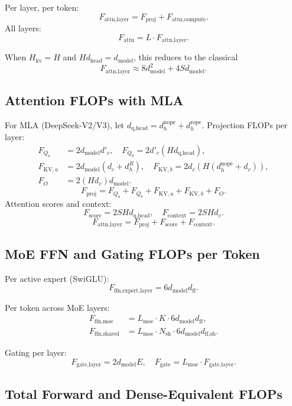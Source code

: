 \documentclass[11pt]{article}
\begin{document}
Per layer, per token:
\[
F_{\text{attn,layer}} = F_{\text{proj}} + F_{\text{attn,compute}}.
\]
All layers:
\[
F_{\text{attn}} = L \cdot F_{\text{attn,layer}}.
\]

When $H_{\text{kv}} = H$ and $H d_{\text{head}} = d_{\text{model}}$,
this reduces to the classical
\[
F_{\text{attn,layer}} \approx
8 d_{\text{model}}^2 + 4 S d_{\text{model}}.
\]

\subsection{Attention FLOPs with MLA}
For MLA (DeepSeek-V2/V3), let $d_{\text{q,head}} = d^{\text{nope}}_h + d^{\text{rope}}_h$.
Projection FLOPs per layer:
\begin{align*}
F_{Q_a} &= 2 d_{\text{model}} d'_c, \quad
F_{Q_b} = 2 d'_c (H d_{\text{q,head}}), \\
F_{\text{KV},a} &= 2 d_{\text{model}} (d_c + d^R_h), \quad
F_{\text{KV},b} = 2 d_c (H (d^{\text{nope}}_h + d_v)), \\
F_O &= 2 (H d_v) d_{\text{model}}.
\end{align*}
\[
F_{\text{proj}} = F_{Q_a} + F_{Q_b} + F_{\text{KV},a} + F_{\text{KV},b} + F_O.
\]
Attention scores and context:
\[
F_{\text{score}} = 2 S H d_{\text{q,head}}, \quad
F_{\text{context}} = 2 S H d_v.
\]
\[
F_{\text{attn,layer}} = F_{\text{proj}} + F_{\text{score}} + F_{\text{context}}.
\]

\subsection{MoE FFN and Gating FLOPs per Token}

Per active expert (SwiGLU):
\[
F_{\text{ffn,expert,layer}} = 6 d_{\text{model}} d_{\text{ff}}.
\]

Per token across MoE layers:
\begin{align*}
F_{\text{ffn,moe}} &= L_{\text{moe}} \cdot K \cdot 6 d_{\text{model}} d_{\text{ff}}, \\
F_{\text{ffn,shared}} &= L_{\text{moe}} \cdot N_{\text{sh}} \cdot 6 d_{\text{model}} d_{\text{ff,sh}}.
\end{align*}

Gating per layer:
\[
F_{\text{gate,layer}} = 2 d_{\text{model}} E,
\quad
F_{\text{gate}} = L_{\text{moe}} \cdot F_{\text{gate,layer}}.
\]

\subsection{Total Forward and Dense-Equivalent FLOPs}
\end{document}
